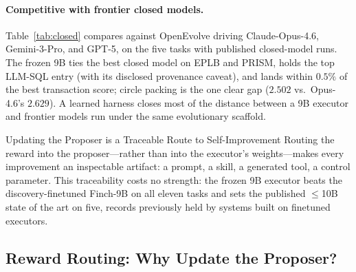 \paragraph{Competitive with frontier closed models.}
\begin{table}
\vspace{-10pt}
\centering
\resizebox{\linewidth}{!}{}
\caption{\textbf{vs.\ closed models under OpenEvolve} (bold $=$ best per
row; per-task sources in Appendix~\ref{app:full-results}).}
\label{tab:closed}
\vspace{-8pt}
\end{table}
Table~\ref{tab:closed} compares \method{} against OpenEvolve driving
Claude-Opus-4.6, Gemini-3-Pro, and GPT-5, on the five tasks with published
closed-model runs.  The frozen 9B ties the best closed model on EPLB and
PRISM, holds the top LLM-SQL entry (with its disclosed provenance
caveat), and lands within $0.5\%$ of the best
transaction score; circle packing is the one clear gap ($2.502$ vs.\
Opus-4.6's $2.629$).  A learned harness closes most of the distance between
a 9B executor and frontier models run under the same evolutionary scaffold.

\vspace{2mm}
\begin{takeawaybox}{Updating the Proposer is a Traceable Route to Self-Improvement}
Routing the reward into the proposer---rather than into the executor's
weights---makes every improvement an inspectable artifact: a prompt, a
skill, a generated tool, a control parameter.  This traceability costs no
strength: the frozen 9B executor beats the discovery-finetuned Finch-9B on
all eleven tasks and sets the published $\le$10B state of the art on five,
records previously held by systems built on finetuned executors.
\end{takeawaybox}
\vspace{2mm}

\subsection{Reward Routing: Why Update the Proposer?}
\label{sec:exp-routing}

